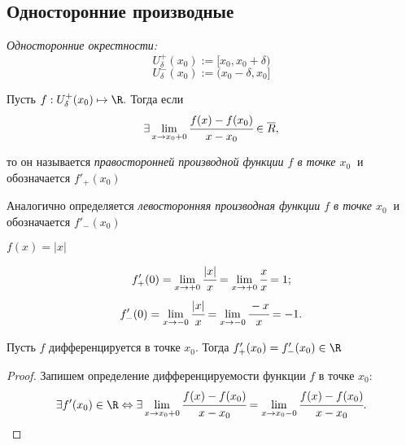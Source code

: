 \subsection{Односторонние производные}
\begin{definition}
	\textit{Односторонние окрестности:}
	$$
	U^{+}_{\delta} (x_{0}) := [x_{0}, x_{0} + \delta) 
	$$
	$$
	U^{-}_{\delta} (x_{0}) := (x_{0} - \delta, x_{0}]
	$$
\end{definition}

\begin{definition}
	Пусть $f:U^{+}_{\delta} (x_{0}) \mapsto \R.$ Тогда если
	$$\exists \lim\limits_{x \to x_{0} +0} \cfrac{f(x) - f(x_{0})}{x-x_{0}} \in \overline{R},$$
	
	то он называется \textit{правосторонней производной функции $f$ в точке $x_{0} \ $} и обозначается $f'_{+}(x_{0})$
	
	Аналогично определяется \textit{левосторонняя производная функции $f$ в точке $x_{0} \ $} и обозначается $f'_{-}(x_{0})$
\end{definition}
\begin{example}
	$ f(x) = |x| $
	
	$$
	f'_{+}(0) = \lim\limits_{x \to +0} \cfrac{|x|}{x} = \lim\limits_{x\to +0} \cfrac{x}{x} = 1;
	$$
	$$
	f'_{-}(0) = \lim\limits_{x \to -0} \cfrac{|x|}{x} = \lim\limits_{x\to -0} \cfrac{-x}{x} = -1.
	$$
\end{example}

\begin{theorem}
	Пусть $f$ дифференцируется в точке $x_{0}$. Тогда $f'_{+}(x_{0}) = f'_{-}(x_{0}) \in \R$ 
\end{theorem}
\begin{proof}
	Запишем определение дифференцируемости функции $f$ в точке $x_{0}$:
	$$
	\exists f'(x_{0}) \in \R \Leftrightarrow \exists \lim\limits_{x \to x_{0} +0}  \cfrac{f(x) - f(x_{0})}{x-x_{0}} = \lim\limits_{x \to x_{0} -0} \cfrac{f(x) - f(x_{0})}{x-x_{0}}.$$
\end{proof}

